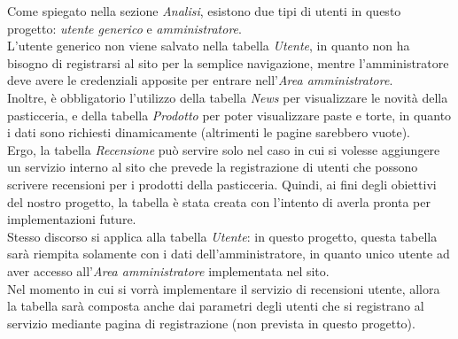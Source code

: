Come spiegato nella sezione \emph{Analisi}, esistono due tipi di utenti in questo progetto: \emph{utente generico} e \emph{amministratore}.\\ L'utente generico non viene salvato nella 
tabella \emph{Utente}, in quanto non ha bisogno di registrarsi al sito per la semplice navigazione, mentre l'amministratore deve avere le credenziali apposite per entrare 
nell'\emph{Area amministratore}.\\
Inoltre, è obbligatorio l'utilizzo della tabella \emph{News} per visualizzare le novità della pasticceria, e della tabella \emph{Prodotto} per poter visualizzare paste e torte, in quanto 
i dati sono richiesti dinamicamente (altrimenti le pagine sarebbero vuote).\\
Ergo, la tabella \emph{Recensione} può servire solo nel caso in cui si volesse aggiungere un servizio interno al sito che prevede la registrazione di utenti che possono scrivere recensioni 
per i prodotti della pasticceria. Quindi, ai fini degli obiettivi del nostro progetto, la tabella è stata creata con l'intento di averla pronta per implementazioni future.\\
Stesso discorso si applica alla tabella \emph{Utente}: in questo progetto, questa tabella sarà riempita solamente con i dati dell'amministratore, in quanto unico utente ad aver accesso 
all'\emph{Area amministratore} implementata nel sito.\\
Nel momento in cui si vorrà implementare il servizio di recensioni utente, allora la tabella sarà composta anche dai parametri degli utenti che si registrano al servizio mediante pagina 
di registrazione (non prevista in questo progetto).
